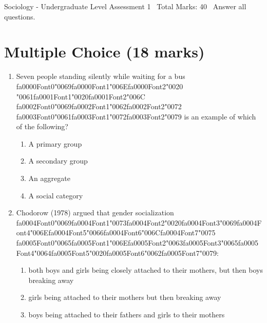 \documentclass[12pt]{article}
\begin{document}
\begin{center}
Sociology - Undergraduate Level Assessment 1 \
Total Marks: 40 \
Answer all questions.
\end{center}

\section*{Multiple Choice (18 marks)}
\begin{enumerate}[label=\arabic*.]
\item Seven people standing silently while waiting for a bus {\csname fa0000Font0\endcsname\char"0069}{\csname fa0000Font1\endcsname\char"006E}{\csname fa0000Font2\endcsname\char"0020} {\char"0061}{\csname fa0001Font1\endcsname\char"0020}{\csname fa0001Font2\endcsname\char"006C} {\csname fa0002Font0\endcsname\char"0069}{\csname fa0002Font1\endcsname\char"0062}{\csname fa0002Font2\endcsname\char"0072} {\csname fa0003Font0\endcsname\char"0061}{\csname fa0003Font1\endcsname\char"0072}{\csname fa0003Font2\endcsname\char"0079} is an example of which of the following?
\begin{enumerate}[label=(\alph*)]
    \item A primary group
    \item A secondary group
    \item An aggregate
    \item A social category
\end{enumerate}
\item Chodorow (1978) argued that gender socialization {\csname fa0004Font0\endcsname\char"0069}{\csname fa0004Font1\endcsname\char"0073}{\csname fa0004Font2\endcsname\char"0020}{\csname fa0004Font3\endcsname\char"0069}{\csname fa0004Font4\endcsname\char"006E}{\csname fa0004Font5\endcsname\char"0066}{\csname fa0004Font6\endcsname\char"006C}{\csname fa0004Font7\endcsname\char"0075} {\csname fa0005Font0\endcsname\char"0065}{\csname fa0005Font1\endcsname\char"006E}{\csname fa0005Font2\endcsname\char"0063}{\csname fa0005Font3\endcsname\char"0065}{\csname fa0005Font4\endcsname\char"0064}{\csname fa0005Font5\endcsname\char"0020}{\csname fa0005Font6\endcsname\char"0062}{\csname fa0005Font7\endcsname\char"0079}:
\begin{enumerate}[label=(\alph*)]
    \item both boys and girls being closely attached to their mothers, but then boys breaking away
    \item girls being attached to their mothers but then breaking away
    \item boys being attached to their fathers and girls to their mothers

\end{enumerate}
\end{enumerate}
\end{document}
